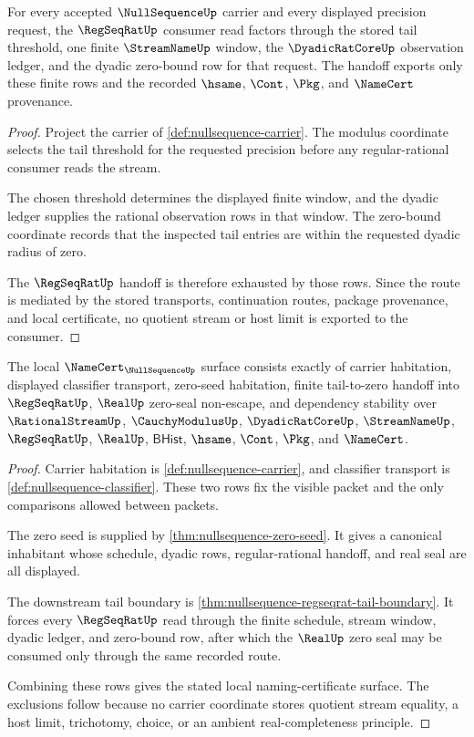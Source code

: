 \begin{theorem}
\label{thm:nullsequence-regseqrat-tail-boundary}
For every accepted $\NullSequenceUp$ carrier and every displayed precision request, the $\RegSeqRatUp$ consumer read factors through the stored tail threshold, one finite $\StreamNameUp$ window, the $\DyadicRatCoreUp$ observation ledger, and the dyadic zero-bound row for that request. The handoff exports only these finite rows and the recorded $\hsame$, $\Cont$, $\Pkg$, and $\NameCert$ provenance.
\end{theorem}
\begin{proof}
Project the carrier of \autoref{def:nullsequence-carrier}. The modulus coordinate selects the tail threshold for the requested precision before any regular-rational consumer reads the stream.

The chosen threshold determines the displayed finite window, and the dyadic ledger supplies the rational observation rows in that window. The zero-bound coordinate records that the inspected tail entries are within the requested dyadic radius of zero.

The $\RegSeqRatUp$ handoff is therefore exhausted by those rows. Since the route is mediated by the stored transports, continuation routes, package provenance, and local certificate, no quotient stream or host limit is exported to the consumer.
\end{proof}

\begin{theorem}
\label{thm:nullsequence-namecert-obligation-surface}
The local $\NameCert_{\NullSequenceUp}$ surface consists exactly of carrier habitation, displayed classifier transport, zero-seed habitation, finite tail-to-zero handoff into $\RegSeqRatUp$, $\RealUp$ zero-seal non-escape, and dependency stability over $\RationalStreamUp$, $\CauchyModulusUp$, $\DyadicRatCoreUp$, $\StreamNameUp$, $\RegSeqRatUp$, $\RealUp$, $\mathsf{BHist}$, $\hsame$, $\Cont$, $\Pkg$, and $\NameCert$.
\end{theorem}
\begin{proof}
Carrier habitation is \autoref{def:nullsequence-carrier}, and classifier transport is \autoref{def:nullsequence-classifier}. These two rows fix the visible packet and the only comparisons allowed between packets.

The zero seed is supplied by \autoref{thm:nullsequence-zero-seed}. It gives a canonical inhabitant whose schedule, dyadic rows, regular-rational handoff, and real seal are all displayed.

The downstream tail boundary is \autoref{thm:nullsequence-regseqrat-tail-boundary}. It forces every $\RegSeqRatUp$ read through the finite schedule, stream window, dyadic ledger, and zero-bound row, after which the $\RealUp$ zero seal may be consumed only through the same recorded route.

Combining these rows gives the stated local naming-certificate surface. The exclusions follow because no carrier coordinate stores quotient stream equality, a host limit, trichotomy, choice, or an ambient real-completeness principle.
\end{proof}

